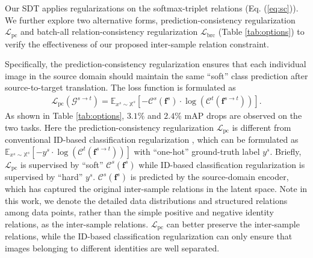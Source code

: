 \documentclass[journal]{IEEEtran}
\def\vf{{\bm{f}}}
\def\sX{{\mathbb{X}}}
\begin{document}
Our SDT applies regularizations on the softmax-triplet relations (Eq. (\ref{eq:sc})).
We further explore two alternative forms, prediction-consistency regularization $\mathcal{L}_\text{pc}$ and batch-all relation-consistency regularization $\mathcal{L}_\text{brc}$ (Table \ref{tab:options})
to verify the effectiveness of our proposed inter-sample relation constraint.

Specifically, the prediction-consistency regularization ensures that each individual image in the source domain should maintain the same ``soft'' class prediction after source-to-target translation.
The loss function is formulated as
\begin{align}
\mathcal{L}_\text{pc}(\mathcal{G}^{s\to t})=
\mathbb{E}_{x^s\sim \sX^s} [ - \mathcal{C}^s(\vf^s) \cdot \log (\mathcal{C}^t(\vf^{s \to t})) ]. \nonumber
\end{align}
As shown in Table \ref{tab:options},
$3.1\%$ and $2.4\%$ mAP drops are observed on the two tasks.
 {Here the prediction-consistency regularization $\mathcal{L}_\text{pc}$ is different from conventional ID-based classification regularization \cite{deng2018similarity,chen2019instance,zou2020joint}, which can be formulated as $\mathbb{E}_{x^s\sim \sX^s} [ - y^s \cdot \log (\mathcal{C}^t(\vf^{s \to t})) ]$ with ``one-hot'' ground-truth label $y^s$.   Briefly, $\mathcal{L}_\text{pc}$ is supervised by ``soft'' $\mathcal{C}^s(\vf^s)$ while ID-based classification regularization is supervised by ``hard'' $y^s$. $\mathcal{C}^s(\vf^s)$ is predicted by the source-domain encoder, which has captured the original inter-sample relations in the latent space. Note in this work, we denote the detailed data distributions and structured relations among data points, rather than the simple positive and negative identity relations, as the inter-sample relations.  $\mathcal{L}_\text{pc}$ can better preserve the inter-sample relations, while the ID-based classification regularization can only ensure that images belonging to different identities are well separated.}
\end{document}
